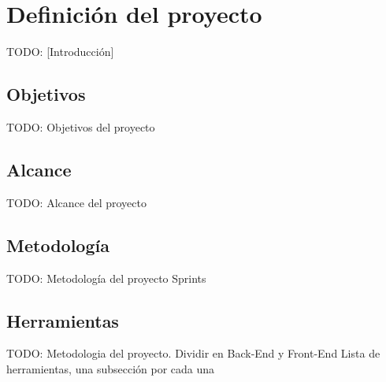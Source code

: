 \chapter{Definición del proyecto\label{cap:defProyecto}}

TODO: [Introducción]


\section{Objetivos\label{sec:dp:objetivos}}

TODO: Objetivos del proyecto


\section{Alcance\label{sec:dp:alcance}}

TODO: Alcance del proyecto


\section{Metodología\label{sec:dp:metodologia}}

TODO: Metodología del proyecto {Sprints}


\section{Herramientas\label{sec:dp:herramientas}}

TODO: Metodologia del proyecto.
  {Dividir en Back-End y Front-End}
  {Lista de herramientas, una subsección por cada una}